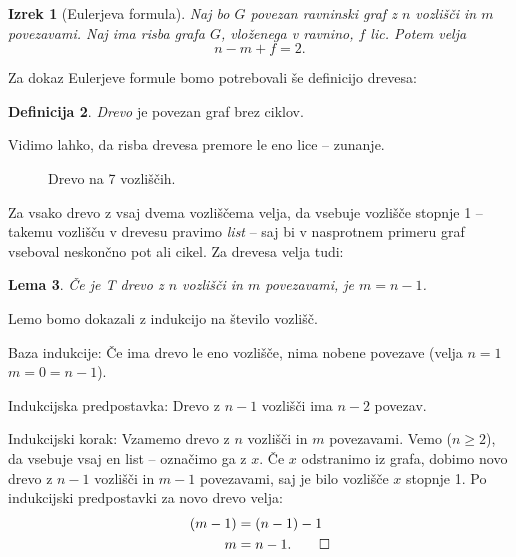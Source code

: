 \documentclass[12pt,a4paper]{amsart}
\theoremstyle{definition} %
\newtheorem{definicija}{Definicija}[section]
\theoremstyle{plain} %
\newtheorem{lema}[definicija]{Lema}
\newtheorem{izrek}[definicija]{Izrek}
\begin{document}
\begin{izrek}[Eulerjeva formula]
    \label{izr:euler-formula}
    Naj bo $G$ povezan ravninski graf z $n$ vozlišči in $m$ povezavami. Naj ima risba grafa $G$, vloženega v ravnino, $f$ lic. Potem velja
    \[ n - m + f = 2 .\]
\end{izrek}

Za dokaz Eulerjeve formule bomo potrebovali še definicijo drevesa:

\begin{definicija}
    \emph{Drevo} je povezan graf brez ciklov.
\end{definicija}

Vidimo lahko, da risba drevesa premore le eno lice -- zunanje.

\begin{figure}[h]
    
    \caption{Drevo na 7 vozliščih.}
\end{figure}

Za vsako drevo z vsaj dvema vozliščema velja, da vsebuje vozlišče stopnje 1 -- takemu vozlišču v drevesu pravimo \emph{list} -- saj bi v nasprotnem primeru graf vseboval neskončno pot ali cikel. Za drevesa velja tudi:

\begin{lema}
    Če je T drevo z $n$ vozlišči in $m$ povezavami, je $m=n-1$.
\end{lema}

\proof
    Lemo bomo dokazali z indukcijo na število vozlišč.
    
    Baza indukcije: Če ima drevo le eno vozlišče, nima nobene povezave (velja $n = 1$ $m = 0 = n-1$).
    
    Indukcijska predpostavka: Drevo z $n-1$ vozlišči ima $n-2$ povezav.
    
    Indukcijski korak: Vzamemo drevo z $n$ vozlišči in $m$ povezavami. Vemo ($n \geq 2$), da vsebuje vsaj en list -- označimo ga z $x$. Če $x$ odstranimo iz grafa, dobimo novo drevo z $n-1$ vozlišči in $m-1$ povezavami, saj je bilo vozlišče $x$ stopnje 1. Po indukcijski predpostavki za novo drevo velja:
    \begin{align*}
        (m-1) &= (n-1) - 1 \\
        m     &= n - 1. \qedhere
    \end{align*}
\endproof
\end{document}
